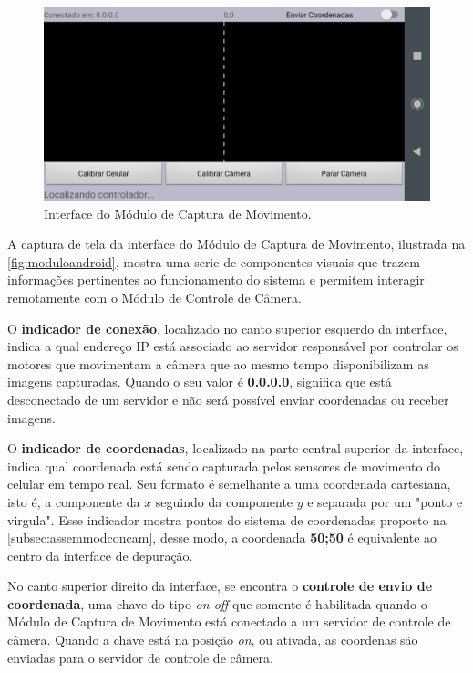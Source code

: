 \begin{figure}[H]
	\centering
	\includegraphics[width=1\textwidth]{figuras/modulo_android_1.png}
	\caption{Interface do Módulo de Captura de Movimento.}
	\label{fig:moduloandroid}
\end{figure}

A captura de tela da interface do Módulo de Captura de Movimento, ilustrada na \autoref{fig:moduloandroid}, mostra uma serie de componentes visuais que trazem informações pertinentes ao funcionamento do sistema e permitem interagir remotamente com o Módulo de Controle de Câmera. \par

O \textbf{indicador de conexão}, localizado no canto superior esquerdo da interface, indica a qual endereço IP está associado ao servidor responsável por controlar os motores que movimentam a câmera que ao mesmo tempo disponibilizam as imagens capturadas. Quando o seu valor é \textbf{0.0.0.0}, significa que está desconectado de um servidor e não será possível enviar coordenadas ou receber imagens.\par

O \textbf{indicador de coordenadas}, localizado na parte central superior da interface, indica qual coordenada está sendo capturada pelos sensores de movimento do celular em tempo real. Seu formato é semelhante a uma coordenada cartesiana, isto é, a componente da $x$ seguindo da componente $y$ e separada por um "ponto e virgula". Esse indicador mostra pontos do sistema de coordenadas proposto na \autoref{subsec:assemmodconcam}, desse modo, a coordenada \textbf{50;50} é equivalente ao centro da interface de depuração.\par

No canto superior direito da interface, se encontra o \textbf{controle de envio de coordenada}, uma chave do tipo \textit{on-off} que somente é habilitada quando o Módulo de Captura de Movimento está conectado a um servidor de controle de câmera. Quando a chave está na posição \textit{on}, ou ativada, as coordenas são enviadas para o servidor de controle de câmera.\par

